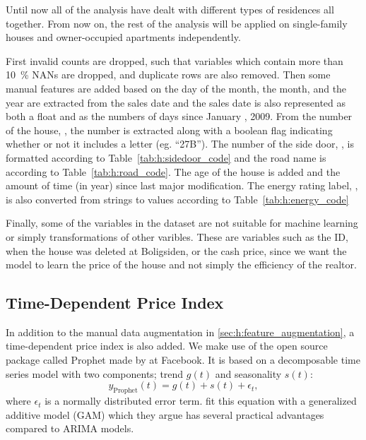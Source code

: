 \documentclass[a4paper, twoside, nobib]{tufte-book}
\newcommand{\code}[1]{\colorbox{light-gray}{\texttt{\detokenize{#1}}}}
\newcommand{\q}[1]{``#1''}
\newcommand{\autocite}[1]{\citep{#1}}
\begin{document}
Until now all of the analysis have dealt with different types of residences all together. From now on, the rest of the analysis will be applied on single-family houses and owner-occupied apartments independently. 

First invalid counts are dropped, such that variables which contain more than \SI{10}{\percent} NANs are dropped, and duplicate rows are also removed. Then some manual features are added based on the day of the month, the month, and the year are extracted from the sales date and the sales date is also represented as both a float and as the numbers of days since January , \num{2009}. From the number of the house, \code{HusNr}, the number is extracted along with a boolean flag indicating whether or not it includes a letter (eg. \q{27B}). The number of the side door, \code{SidedoerNr}, is formatted according to Table~\ref{tab:h:sidedoor_code} and the road name is according to  Table~\ref{tab:h:road_code}. The age of the house is added and the amount of time (in year) since last major modification. The energy rating label, \code{EnergiMaerke}, is also converted from strings to values according to  Table~\ref{tab:h:energy_code} 

Finally, some of the variables in the dataset are not suitable for machine learning or simply transformations of other varibles. These are variables such as the ID, when the house was deleted at Boligsiden, or the cash price, since we want the model to learn the price of the house and not simply the efficiency of the realtor.

\subsection{Time-Dependent Price Index}

In addition to the manual data augmentation in \autoref{sec:h:feature_augmentation}, a time-dependent price index is also added. We make use of the open source package called Prophet made by \citet{taylorForecastingScale} at Facebook. It is based on a decomposable time series model \autocite{harveyEstimationProceduresStructural1990} with two components; trend $g(t)$ and seasonality $s(t)$:
\begin{equation}
  y_\mathrm{Prophet}(t) = g(t) + s(t) + \epsilon_t,
\end{equation}
where $\epsilon_t$ is a normally distributed error term. \citet{taylorForecastingScale} fit this equation with a generalized additive model (GAM) \autocite{hastieGeneralizedAdditiveModels1987} which they argue has several practical advantages compared to ARIMA models. 
\end{document}
